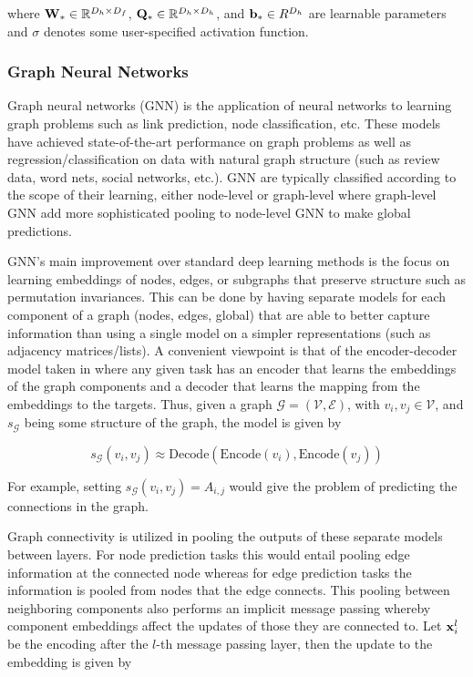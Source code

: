 where $\mVector{W}_* \in \R^{D_h \times D_f}$, $\mVector{Q}_* \in \R^{D_h \times D_h}$, and $\mVector{b}_* \in R^{D_h}$ are learnable parameters and $\sigma$ denotes some user-specified activation function.

\subsubsection{Graph Neural Networks}


Graph neural networks (GNN) is the application of neural networks to learning graph problems such as link prediction, node classification, etc. These models have achieved state-of-the-art performance on graph problems as well as regression/classification on data with natural graph structure (such as review data, word nets, social networks, etc.). GNN are typically classified according to the scope of their learning, either node-level or graph-level where graph-level GNN add more sophisticated pooling to node-level GNN to make global predictions. 

GNN's main improvement over standard deep learning methods is the focus on learning embeddings of nodes, edges, or subgraphs that preserve structure such as permutation invariances. This can be done by having separate models for each component of a graph (nodes, edges, global) that are able to better capture information than using a single model on a simpler representations (such as adjacency matrices/lists). A convenient viewpoint is that of the encoder-decoder model taken in \cite{Hamilton2017} where any given task has an encoder that learns the embeddings of the graph components and a decoder that learns the mapping from the embeddings to the targets. Thus, given a graph $\mathcal{G} = (\mathcal{V}, \mathcal{E})$, with $v_i, v_j \in \mathcal{V}$, and $s_{\mathcal{G}}$ being some structure of the graph, the model is given by

\begin{equation}
s_{\mathcal{G}}(v_i, v_j) \approx \text{Decode}(\text{Encode}(v_i), \text{Encode}(v_j))
\end{equation}

For example, setting $s_{\mathcal{G}}(v_i, v_j) = A_{i,j}$ would give the problem of predicting the connections in the graph.

Graph connectivity is utilized in pooling the outputs of these separate models between layers. For node prediction tasks this would entail pooling edge information at the connected node whereas for edge prediction tasks the information is pooled from nodes that the edge connects. This pooling between neighboring components also performs an implicit message passing whereby component embeddings affect the updates of those they are connected to. Let $\mVector{x}_i^{l}$ be the encoding after the $l$-th message passing layer, then the update to the embedding is given by

